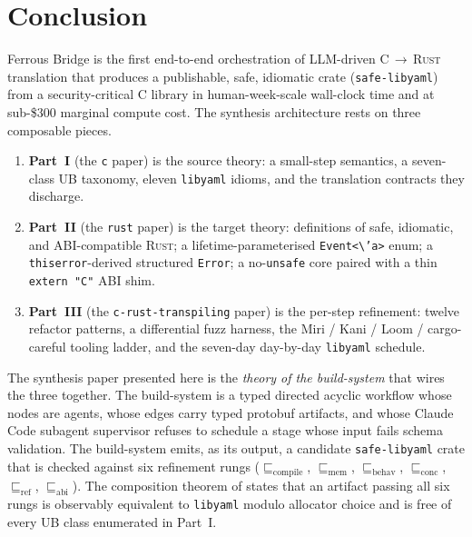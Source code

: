 \documentclass[12pt]{article}
\theoremstyle{definition}
\theoremstyle{remark}
\newcommand{\rust}{\textnormal{\textsc{Rust}}}
\newcommand{\libyaml}{\texttt{libyaml}}
\newcommand{\safelibyaml}{\texttt{safe-libyaml}}
\newcommand{\Compile}{\ensuremath{\sqsubseteq_{\!\mathrm{compile}}}}
\newcommand{\Memory}{\ensuremath{\sqsubseteq_{\!\mathrm{mem}}}}
\newcommand{\Behav}{\ensuremath{\sqsubseteq_{\!\mathrm{behav}}}}
\newcommand{\Conc}{\ensuremath{\sqsubseteq_{\!\mathrm{conc}}}}
\newcommand{\Refine}{\ensuremath{\sqsubseteq_{\!\mathrm{ref}}}}
\newcommand{\ABI}{\ensuremath{\sqsubseteq_{\!\mathrm{abi}}}}
\begin{document}
\section{Conclusion}
\label{sec:conclusion}

Ferrous Bridge is the first end-to-end orchestration of LLM-driven
C\,$\to$\,\rust{} translation that produces a publishable, safe,
idiomatic crate (\safelibyaml{}) from a security-critical C library
in human-week-scale wall-clock time and at sub-\$300 marginal compute
cost. The synthesis architecture rests on three composable pieces.

\begin{enumerate}
\item \textbf{Part~I} (the \texttt{c} paper) is the source theory: a
  small-step semantics, a seven-class UB taxonomy, eleven \libyaml{}
  idioms, and the translation contracts they discharge.
\item \textbf{Part~II} (the \texttt{rust} paper) is the target
  theory: definitions of safe, idiomatic, and ABI-compatible \rust{};
  a lifetime-parameterised \texttt{Event<\textbackslash 'a>} enum;
  a \texttt{thiserror}-derived structured \texttt{Error}; a no-\texttt{unsafe}
  core paired with a thin \texttt{extern "C"} ABI shim.
\item \textbf{Part~III} (the \texttt{c-rust-transpiling} paper) is
  the per-step refinement: twelve refactor patterns, a differential
  fuzz harness, the Miri / Kani / Loom / cargo-careful tooling
  ladder, and the seven-day day-by-day \libyaml{} schedule.
\end{enumerate}

The synthesis paper presented here is the \emph{theory of the
build-system} that wires the three together. The build-system is a
typed directed acyclic workflow whose nodes are agents, whose edges
carry typed protobuf artifacts, and whose Claude Code subagent supervisor refuses to
schedule a stage whose input fails schema validation. The build-system
emits, as its output, a candidate \safelibyaml{} crate that is
checked against six refinement rungs (\(\Compile\), \(\Memory\),
\(\Behav\), \(\Conc\), \(\Refine\), \(\ABI\)). The composition theorem
of  states that an artifact passing all six
rungs is observably equivalent to \libyaml{} modulo allocator choice
and is free of every UB class enumerated in Part~I.
\end{document}
